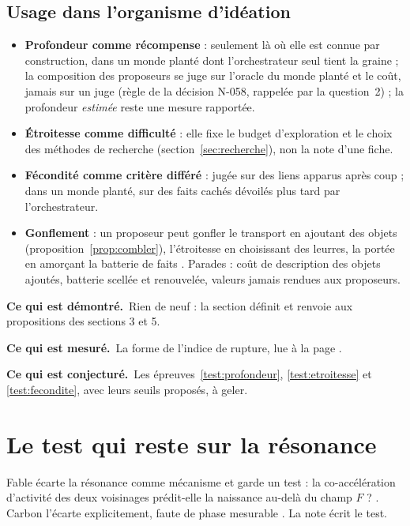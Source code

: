 \documentclass[11pt,a4paper]{article}
\theoremstyle{definition}
\theoremstyle{plain}
\newcommand{\demontre}{\par\noindent\textbf{Ce qui est démontré.}~}
\newcommand{\mesure}{\par\smallskip\noindent\textbf{Ce qui est mesuré.}~}
\newcommand{\conjecture}{\par\smallskip\noindent\textbf{Ce qui est conjecturé.}~}
\begin{document}
\subsection{Usage dans l'organisme d'idéation}
\begin{itemize}
\item \textbf{Profondeur comme récompense} : seulement là où elle est connue par construction, dans
un monde planté dont l'orchestrateur seul tient la graine ; la composition des proposeurs se juge
sur l'oracle du monde planté et le coût, jamais sur un juge (règle de la décision N-058, rappelée
par la question~2) ; la profondeur \emph{estimée} reste une mesure rapportée.
\item \textbf{Étroitesse comme difficulté} : elle fixe le budget d'exploration et le choix des
méthodes de recherche (section~\ref{sec:recherche}), non la note d'une fiche.
\item \textbf{Fécondité comme critère différé} : jugée sur des liens apparus après coup ; dans un
monde planté, sur des faits cachés dévoilés plus tard par l'orchestrateur.
\item \textbf{Gonflement} : un proposeur peut gonfler le transport en ajoutant des objets
(proposition~\ref{prop:combler}), l'étroitesse en choisissant des leurres, la portée en amorçant la
batterie de faits \cite[section~5]{q2}. Parades : coût de description des objets ajoutés, batterie
scellée et renouvelée, valeurs jamais rendues aux proposeurs.
\end{itemize}

\begin{statuts}
\demontre Rien de neuf : la section définit et renvoie aux propositions des sections 3 et 5.
\mesure La forme de l'indice de rupture, lue à la page \cite{wu2019}.
\conjecture Les épreuves~\ref{test:profondeur}, \ref{test:etroitesse} et \ref{test:fecondite}, avec
leurs seuils proposés, à geler.
\end{statuts}

\section{Le test qui reste sur la résonance}
\label{sec:resonance}

Fable écarte la résonance comme mécanisme et garde un test : la co-accélération d'activité des deux
voisinages prédit-elle la naissance au-delà du champ $F$ ? \cite[partie~2]{fable}. Carbon l'écarte
explicitement, faute de phase mesurable \cite[l.~64]{carbon}. La note écrit le test.
\end{document}
